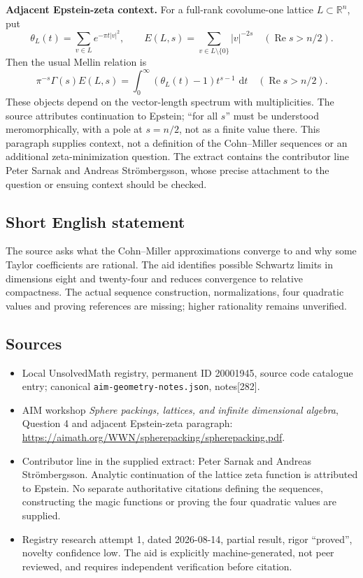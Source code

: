 \documentclass[11pt]{article}
\newcommand{\R}{\mathbb{R}}
\newcommand{\dd}{\,\mathrm{d}}
\begin{document}
\textbf{Adjacent Epstein-zeta context.} For a full-rank covolume-one lattice $L\subset\R^n$, put
\[
 \theta_L(t)=\sum_{v\in L}e^{-\pi t|v|^2},\qquad
 E(L,s)=\sum_{v\in L\setminus\{0\}}|v|^{-2s}
 \quad(\operatorname{Re}s>n/2).
\]
Then the usual Mellin relation is
\[
 \pi^{-s}\Gamma(s)E(L,s)
 =\int_0^\infty(\theta_L(t)-1)t^{s-1}\,\dd t
 \quad(\operatorname{Re}s>n/2).
\]
These objects depend on the vector-length spectrum with multiplicities. The source attributes continuation to Epstein; ``for all $s$'' must be understood meromorphically, with a pole at $s=n/2$, not as a finite value there. This paragraph supplies context, not a definition of the Cohn--Miller sequences or an additional zeta-minimization question. The extract contains the contributor line Peter Sarnak and Andreas Str\"ombergsson, whose precise attachment to the question or ensuing context should be checked.
\subsection{Short English statement}
The source asks what the Cohn--Miller approximations converge to and why some Taylor coefficients are rational. The aid identifies possible Schwartz limits in dimensions eight and twenty-four and reduces convergence to relative compactness. The actual sequence construction, normalizations, four quadratic values and proving references are missing; higher rationality remains unverified.
\subsection{Sources}
\begin{itemize}
\item Local UnsolvedMath registry, permanent ID 20001945, source code catalogue entry; canonical \texttt{aim-geometry-notes.json}, notes[282].
\item AIM workshop \emph{Sphere packings, lattices, and infinite dimensional algebra}, Question 4 and adjacent Epstein-zeta paragraph: \url{https://aimath.org/WWN/spherepacking/spherepacking.pdf}.
\item Contributor line in the supplied extract: Peter Sarnak and Andreas Str\"ombergsson. Analytic continuation of the lattice zeta function is attributed to Epstein. No separate authoritative citations defining the sequences, constructing the magic functions or proving the four quadratic values are supplied.
\item Registry research attempt 1, dated 2026-08-14, partial result, rigor ``proved'', novelty confidence low. The aid is explicitly machine-generated, not peer reviewed, and requires independent verification before citation.
\end{itemize}
\end{document}
